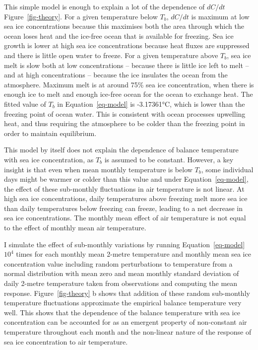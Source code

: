 \documentclass[tc, manuscript]{copernicus}
\begin{document}
This simple model is enough to explain a lot of the dependence of
\(dC/dt\) Figure~\ref{fig-theory}. For a given temperature below
\(T_b\), \(dC/dt\) is maximum at low sea ice concentrations because this
maximises both the area through which the ocean loses heat and the
ice-free ocean that is available for freezing. Sea ice growth is lower
at high sea ice concentrations because heat fluxes are suppressed and
there is little open water to freeze. For a given temperature above
\(T_b\), sea ice melt is slow both at low concentrations -- because
there is little ice left to melt -- and at high concentrations --
because the ice insulates the ocean from the atmosphere. Maximum melt is
at around 75\% sea ice concentration, when there is enough ice to melt
and enough ice-free ocean for the ocean to exchange heat. The fitted
value of \(T_b\) in Equation~\ref{eq-model} is -3.17361°C, which is
lower than the freezing point of ocean water. This is consistent with
ocean processes upwelling heat, and thus requiring the atmosphere to be
colder than the freezing point in order to maintain equilibrium.

This model by itself does not explain the dependence of balance
temperature with sea ice concentration, as \(T_b\) is assumed to be
constant. However, a key insight is that even when mean monthly
temperature is below \(T_b\), some individual days might be warmer or
colder than this value and under Equation~\ref{eq-model}, the effect of
these sub-monthly fluctuations in air temperature is not linear. At high
sea ice concentrations, daily temperatures above freezing melt more sea
ice than daily temperatures below freezing can freeze, leading to a net
decrease in sea ice concentrations. The monthly mean effect of air
temperature is not equal to the effect of monthly mean air temperature.

I simulate the effect of sub-monthly variations by running
Equation~\ref{eq-model} \ensuremath{10^{4}} times for each monthly mean
2-metre temperature and monthly mean sea ice concentration value
including random perturbations to temperature from a normal distribution
with mean zero and mean monthly standard deviation of daily 2-metre
temperature taken from observations and computing the mean response.
Figure~\ref{fig-theory} b shows that addition of these random
sub-monthly temperature fluctuations approximate the empirical balance
temperature very well. This shows that the dependence of the balance
temperature with sea ice concentration can be accounted for as an
emergent property of non-constant air temperature throughout each month
and the non-linear nature of the response of sea ice concentration to
air temperature.
\end{document}
